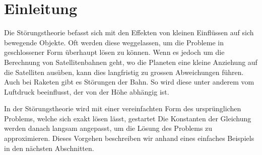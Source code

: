 \section{Einleitung\label{perturbation:section:einleitung}}
Die Störungstheorie befasst sich mit den Effekten von kleinen Einflüssen auf sich bewegende Objekte.
Oft werden diese weggelassen, um die Probleme in geschlossener Form überhaupt lösen zu können.
Wenn es jedoch um die Berechnung von Satellitenbahnen geht, wo die Planeten eine kleine Anziehung auf die Satelliten ausüben, kann dies langfristig zu grossen Abweichungen führen.
Auch bei Raketen gibt es Störungen der Bahn.
So wird diese unter anderem vom Luftdruck beeinflusst, der von der Höhe abhängig ist.

In der Störungstheorie wird mit einer vereinfachten Form des ursprünglichen Problems, welche sich exakt lösen lässt, gestartet
Die Konstanten der Gleichung werden danach langsam angepasst, um die Lösung des Problems zu approximieren.
Dieses Vorgehen beschreiben wir anhand eines einfaches Beispiels in den nächsten Abschnitten.


